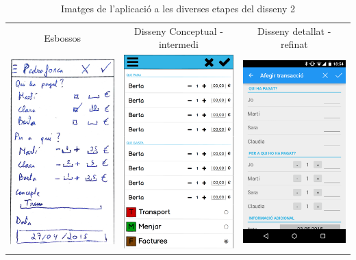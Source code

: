 \begin{table}
\caption{Imatges de l'aplicació a les diverses etapes del disseny 2}
\label{table:images_app2}
\begin{tabular}{| c | c | c |}
\hline
Esbossos & Disseny Conceptual - intermedi & Disseny detallat - refinat \\
\includegraphics[width=50mm]{1_Add_group_transaction.jpg} &
\includegraphics[width=50mm]{2_Add_group_transaction.png} &
\includegraphics[width=50mm]{3_Add_group_transaction.png}  \\

\end{tabular}
\end{table}
